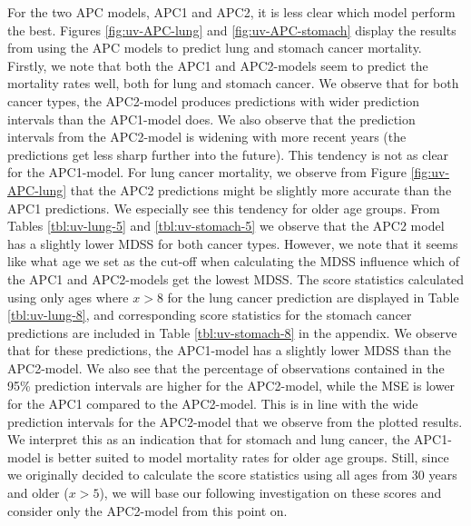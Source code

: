 \newpar For the two APC models, APC1 and APC2, it is less clear which model perform the best. Figures \ref{fig:uv-APC-lung} and \ref{fig:uv-APC-stomach} display the results from using the APC models to predict lung and stomach cancer mortality. Firstly, we note that both the APC1 and APC2-models seem to predict the mortality rates well, both for lung and stomach cancer. We observe that for both cancer types, the APC2-model produces predictions with wider prediction intervals than the APC1-model does. We also observe that the prediction intervals from the APC2-model is widening with more recent years (the predictions get less sharp further into the future). This tendency is not as clear for the APC1-model. For lung cancer mortality, we observe from Figure \ref{fig:uv-APC-lung} that the APC2 predictions might be slightly more accurate than the APC1 predictions. We especially see this tendency for older age groups. From Tables \ref{tbl:uv-lung-5} and \ref{tbl:uv-stomach-5} we observe that the APC2 model has a slightly lower MDSS for both cancer types.
However, we note that it seems like what age we set as the cut-off when calculating the MDSS influence which of the APC1 and APC2-models get the lowest MDSS. The score statistics calculated using only ages where $x > 8$ for the lung cancer prediction are displayed in Table \ref{tbl:uv-lung-8}, and corresponding score statistics for the stomach cancer predictions are included in Table \ref{tbl:uv-stomach-8} in the appendix. We observe that for these predictions, the APC1-model has a slightly lower MDSS than the APC2-model. We also see that the percentage of observations contained in the 95\% prediction intervals are higher for the APC2-model, while the MSE is lower for the APC1 compared to the APC2-model. This is in line with the wide prediction intervals for the APC2-model that we observe from the plotted results. We interpret this as an indication that for stomach and lung cancer, the APC1-model is better suited to model mortality rates for older age groups. Still, since we originally decided to calculate the score statistics using all ages from 30 years and older ($x > 5$), we will base our following investigation on these scores and consider only the APC2-model from this point on. 

